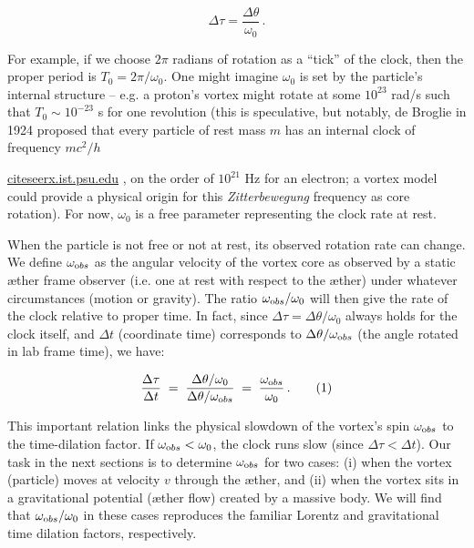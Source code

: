 \documentclass[aps,preprint,superscriptaddress]{revtex4}
\begin{document}
 \begin{equation}
\Delta \tau = \frac{\Delta \theta}{\omega_0} \,.
 \end{equation}

For example, if we choose $2\pi$ radians of rotation as a “tick” of the clock, then the proper period is $T_0 = 2\pi/\omega_0$. One might imagine $\omega_0$ is set by the particle’s internal structure – e.g. a proton’s vortex might rotate at some $10^{23}$ rad/s such that $T_0 \sim 10^{-23}$ s for one revolution (this is speculative, but notably, de Broglie in 1924 proposed that every particle of rest mass $m$ has an internal clock of frequency $mc^2/h$

\href{https://citeseerx.ist.psu.edu/document?repid=rep1&type=pdf&doi=25483f1ebc9dc442a9f1505a49d96eb35e92e3f4#:~:text=al,related%20to%20this%20hypothesis%2C%20including}{citeseerx.ist.psu.edu}
, on the order of $10^{21}$ Hz for an electron; a vortex model could provide a physical origin for this \textit{Zitterbewegung} frequency as core rotation). For now, $\omega_0$ is a free parameter representing the clock rate at rest.

When the particle is not free or not at rest, its observed rotation rate can change. We define $\omega_{\textrm obs}$ as the angular velocity of the vortex core as observed by a static æther frame observer (i.e. one at rest with respect to the æther) under whatever circumstances (motion or gravity). The ratio $\omega_{\textrm obs}/\omega_0$ will then give the rate of the clock relative to proper time. In fact, since $\Delta \tau = \Delta \theta/\omega_0$ always holds for the clock itself, and $\Delta t$ (coordinate time) corresponds to $\Delta \theta/\omega_{\textrm obs}$ (the angle rotated in lab frame time), we have:

 \begin{equation}
\frac{\Delta \tau}{\Delta t} \;=\; \frac{\Delta \theta/\omega_0}{\Delta \theta/\omega_{\textrm obs}} \;=\; \frac{\omega_{\textrm obs}}{\omega_0} \,. \tag{1}
 \end{equation}

This important relation links the physical slowdown of the vortex’s spin $\omega_{\textrm obs}$ to the time-dilation factor. If $\omega_{\textrm obs} < \omega_0$, the clock runs slow (since $\Delta \tau < \Delta t$). Our task in the next sections is to determine $\omega_{\textrm obs}$ for two cases: (i) when the vortex (particle) moves at velocity $v$ through the æther, and (ii) when the vortex sits in a gravitational potential (æther flow) created by a massive body. We will find that $\omega_{\textrm obs}/\omega_0$ in these cases reproduces the familiar Lorentz and gravitational time dilation factors, respectively.
\end{document}
